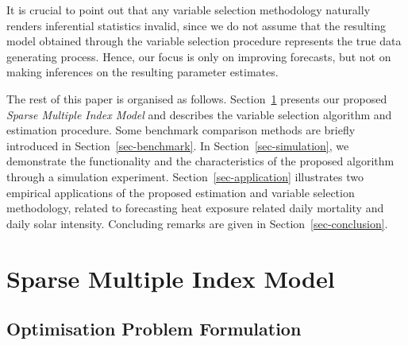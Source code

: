 \documentclass[
  11pt,
  a4paper,
]{article}
\begin{document}
It is crucial to point out that any variable selection methodology
naturally renders inferential statistics invalid, since we do not assume
that the resulting model obtained through the variable selection
procedure represents the true data generating process. Hence, our focus
is only on improving forecasts, but not on making inferences on the
resulting parameter estimates.

The rest of this paper is organised as follows. Section~\ref{sec-SMI}
presents our proposed \emph{Sparse Multiple Index Model} and describes
the variable selection algorithm and estimation procedure. Some
benchmark comparison methods are briefly introduced in
Section~\ref{sec-benchmark}. In Section~\ref{sec-simulation}, we
demonstrate the functionality and the characteristics of the proposed
algorithm through a simulation experiment. Section~\ref{sec-application}
illustrates two empirical applications of the proposed estimation and
variable selection methodology, related to forecasting heat exposure
related daily mortality and daily solar intensity. Concluding remarks
are given in Section~\ref{sec-conclusion}.

\section{Sparse Multiple Index Model}\label{sec-SMI}

\subsection{Optimisation Problem
Formulation}\label{optimisation-problem-formulation}
\end{document}
